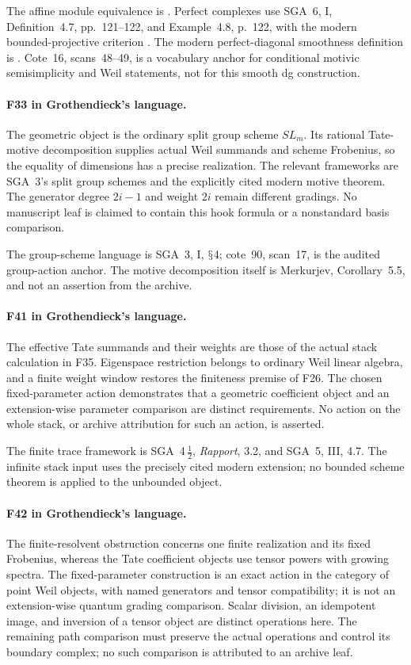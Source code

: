 \documentclass[11pt,a4paper]{article}
\renewcommand{\S}{\ensuremath{\mathsection}}
\newcommand{\fid}[1]{\textsf{#1}}\newcommand{\gate}[1]{\textsf{#1}}
\theoremstyle{named}\newtheorem{finding}{Finding}[section]
\theoremstyle{definition}\newtheorem{definition}[finding]{Definition}
\theoremstyle{remark}\newtheorem{remark}[finding]{Remark}
\begin{document}
The affine module equivalence is
\cite[Lemma~26.7.5, tag~01IB]{StacksAffine}.
Perfect complexes use SGA~6, I, Definition~4.7, pp.~121--122,
and Example~4.8, p.~122, with the modern bounded-projective criterion
\cite[Definition~15.76.1, tag~0657]{StacksAffine}.
The modern perfect-diagonal smoothness definition is
\cite[\S5.1, pp.~13--14]{TabuadaWeil}. Cote~16, scans~48--49, is a vocabulary anchor for conditional motivic semisimplicity and Weil statements, not for this smooth dg construction.


\paragraph{\fid{F33} in Grothendieck's language.}
The geometric object is the ordinary split group scheme $SL_m$.
Its rational Tate-motive decomposition supplies actual Weil
summands and scheme Frobenius, so the equality of dimensions
has a precise realization. The relevant frameworks are SGA~3's
split group schemes and the explicitly cited modern motive
theorem. The generator degree $2i-1$ and weight $2i$ remain
different gradings. No manuscript leaf is claimed to contain
this hook formula or a nonstandard basis comparison.


The group-scheme language is SGA~3, I, \S4; cote~90, scan~17, is the audited group-action anchor. The motive decomposition itself is Merkurjev, Corollary~5.5, and not an assertion from the archive.


\paragraph{\fid{F41} in Grothendieck's language.}
The effective Tate summands and their weights are those of the
actual stack calculation in \fid{F35}. Eigenspace restriction
belongs to ordinary Weil linear algebra, and a finite weight
window restores the finiteness premise of \fid{F26}.
The chosen fixed-parameter action demonstrates that a geometric
coefficient object and an extension-wise parameter comparison
are distinct requirements. No action on the whole stack, or
archive attribution for such an action, is asserted.

The finite trace framework is SGA~4\,$\frac12$, \emph{Rapport}, 3.2, and SGA~5, III, 4.7. The infinite stack input uses the precisely cited modern extension; no bounded scheme theorem is applied to the unbounded object.


\paragraph{\fid{F42} in Grothendieck's language.}
The finite-resolvent obstruction concerns one finite realization
and its fixed Frobenius, whereas the Tate coefficient objects
use tensor powers with growing spectra. The fixed-parameter
construction is an exact action in the category of point Weil
objects, with named generators and tensor compatibility; it is
not an extension-wise quantum grading comparison. Scalar
division, an idempotent image, and inversion of a tensor object
are distinct operations here. The remaining path comparison
must preserve the actual operations and control its boundary
complex; no such comparison is attributed to an archive leaf.
\end{document}

